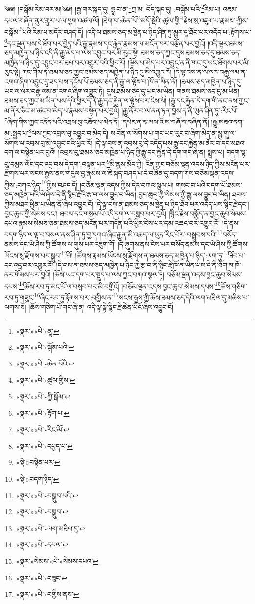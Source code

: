 ༄༅། །བསྒོམ་རིམ་བར་མ།༄༅། །རྒྱ་གར་སྐད་དུ། བྷཱ་བ་ན་\footnote{«སྣར་»«པེ་»ནཱ་}ཀྲ་མ། བོད་སྐད་དུ། :བསྒོམ་པའི་\footnote{«སྣར་»«པེ་»སྒོམ་པའི་}རིམ་པ། འཇམ་དཔལ་གཞོན་ནུར་གྱུར་པ་ལ་ཕྱག་འཚལ་ལོ། །ཐེག་པ་:ཆེན་པོ་\footnote{«སྣར་»«པེ་»ཆེན་པོའི་}མདོ་སྡེའི་:ཚུལ་གྱི་\footnote{«སྣར་»«པེ་»ཚུལ་གྱིས་}རྗེས་སུ་འཇུག་པ་རྣམས་:ཀྱིས་བསྒོམ་\footnote{«སྣར་»«པེ་»ཀྱི་སྒོམ་}པའི་རིམ་པ་མདོར་བཤད་དོ། །འདི་ལ་ཐམས་ཅད་མཁྱེན་པ་ཉིད་ཤིན་ཏུ་མྱུར་དུ་ཐོབ་པར་འདོད་པ་:རྟོགས་པ་\footnote{«སྣར་»«པེ་»རྟོག་པ་}དང་ལྡན་པས་དེ་ཐོབ་པར་བྱེད་པའི་རྒྱུ་རྣམས་དང་རྐྱེན་རྣམས་ལ་མངོན་པར་བརྩོན་པར་བྱའོ། །འདི་ལྟར་ཐམས་ཅད་མཁྱེན་པ་ཉིད་འདི་ནི་རྒྱུ་མེད་པ་ལས་འབྱུང་བར་མི་རུང་སྟེ། ཐམས་ཅད་ཀྱང་དུས་ཐམས་ཅད་དུ་ཐམས་ཅད་མཁྱེན་པ་ཉིད་དུ་འབྱུང་བར་ཐལ་བར་འགྱུར་བའི་ཕྱིར་རོ། །ལྟོས་པ་མེད་པར་འབྱུང་ན་ནི་གང་དུ་ཡང་ཐོགས་པར་མི་རུང་སྟེ། གང་གིས་ན་ཐམས་ཅད་ཀྱང་ཐམས་ཅད་མཁྱེན་པ་ཉིད་དུ་མི་འགྱུར་རོ། །དེ་ལྟ་བས་ན་ལ་ལར་བརྒྱ་ལམ་ན་འགའ་ཞིག་འབྱུང་དུ་ཟད་པས་དངོས་པོ་ཐམས་ཅད་ནི་རྒྱུ་ལ་ལྟོས་པ་ཁོ་ན་ཡིན་ནོ། །ཐམས་ཅད་མཁྱེན་པ་ཉིད་དུ་ཡང་ལ་ལར་བརྒྱ་ལམ་ན་འགའ་ཞིག་འགྱུར་ཏེ། དུས་ཐམས་ཅད་དུ་ཡང་མ་ཡིན། གནས་ཐམས་ཅད་དུ་མ་ཡིན། ཐམས་ཅད་ཀྱང་མ་ཡིན་པས་དེའི་ཕྱིར་དེ་ནི་རྒྱུ་དང་རྐྱེན་ལ་ལྟོས་པར་ངེས་སོ། །རྒྱུ་དང་རྐྱེན་དེ་དག་གི་ནང་ནས་ཀྱང་མ་ནོར་ཅིང་མ་ཚང་བ་མེད་པ་རྣམས་བསྟེན་པར་བྱའོ། །རྒྱུ་ནོར་བ་ལ་ནན་ཏན་བྱས་ན་ནི་ཡུན་ཤིན་ཏུ་:རིང་པོ་\footnote{«སྣར་»«པེ་»རིང་མོ་}ཞིག་གིས་ཀྱང་འདོད་པའི་འབྲས་བུ་འཐོབ་པ་མེད་དོ། །དཔེར་ན་རྭ་ལས་འོ་མ་བཞོ་བ་བཞིན་ནོ། །རྒྱུ་མཐའ་དག་མ་:སྤྱད་པ་\footnote{«སྣར་»«པེ་»དཔྱད་པ་}ལས་ཀྱང་འབྲས་བུ་འབྱུང་བ་མེད་དེ། ས་བོན་ལ་སོགས་པ་གང་ཡང་རུང་བ་ཞིག་མེད་ན་མྱུ་གུ་ལ་སོགས་པ་འབྲས་བུ་མི་འབྱུང་བའི་ཕྱིར་རོ། །དེ་ལྟ་བས་ན་འབྲས་བུ་དེ་འདོད་པས་རྒྱུ་དང་རྐྱེན་མ་ནོར་བ་དང་མཐའ་དག་ལ་བསྟེན་པར་བྱའོ། །འབྲས་བུ་ཐམས་ཅད་མཁྱེན་པ་ཉིད་ཀྱི་རྒྱུ་དང་རྐྱེན་དེ་དག་གང་ཞེ་ན། སྨྲས་པ། བདག་ལྟ་བུ་དམུས་ལོང་དང་འདྲ་བས་དེ་དག་:བསྟན་པར་\footnote{«སྡེ་»བསྟེན་པར་}མི་ནུས་མོད་ཀྱི། འོན་ཀྱང་བཅོམ་ལྡན་འདས་ཉིད་ཀྱིས་མངོན་པར་རྫོགས་པར་སངས་རྒྱས་ནས་གདུལ་བྱ་རྣམས་ལ་ཇི་སྐད་བཤད་པ་དེ་བཞིན་དུ་བདག་གིས་བཅོམ་ལྡན་འདས་ཀྱིས་:བཀའ་ཉིད་\footnote{«སྡེ་»བདག་ཉིད་}ཀྱིས་བཤད་དོ། །བཅོམ་ལྡན་འདས་ཀྱིས་དེར་བཀའ་སྩལ་པ། གསང་བ་པའི་བདག་པོ་ཐམས་ཅད་མཁྱེན་པའི་ཡེ་ཤེས་དེ་ནི་སྙིང་རྗེའི་རྩ་བ་ལས་བྱུང་བ་ཡིན། བྱང་ཆུབ་ཀྱི་སེམས་ཀྱི་རྒྱུ་ལས་བྱུང་བ་ཡིན། ཐབས་ཀྱིས་མཐར་ཕྱིན་པ་ཡིན་ནོ་ཞེས་འབྱུང་ངོ། །དེ་ལྟ་བས་ན་ཐམས་ཅད་མཁྱེན་པ་ཉིད་ཐོབ་པར་འདོད་པས་སྙིང་རྗེ་དང་། བྱང་ཆུབ་ཀྱི་སེམས་དང་། ཐབས་དང་གསུམ་པོ་འདི་དག་ལ་བསླབ་པར་བྱའོ། །སྙིང་རྗེས་བསྐྱོད་ན་བྱང་ཆུབ་སེམས་དཔའ་རྣམས་སེམས་ཅན་ཐམས་ཅད་མངོན་པར་གདོན་པའི་ཕྱིར་ངེས་པར་དམ་འཆའ་བར་འགྱུར་རོ། །དེ་ནས་བདག་ཉིད་ལ་ལྟ་བ་བསལ་ནས་ཤིན་ཏུ་བྱ་དཀའ་ཞིང་རྒྱུན་མི་འཆད་ལ་ཡུན་རིང་པོར་:བསྒྲུབས་པའི་\footnote{«སྣར་»«པེ་»བསྒྲུབ་པའི་}བསོད་ནམས་དང་ཡེ་ཤེས་ཀྱི་ཚོགས་ལ་གུས་པར་འཇུག་གོ། །དེ་ཞུགས་ནས་ངེས་པར་བསོད་ནམས་དང་ཡེ་ཤེས་ཀྱི་ཚོགས་ཡོངས་སུ་རྫོགས་པར་སྒྲུབ་\footnote{«སྣར་»«པེ་»བསྒྲུབ་}བོ། །ཚོགས་རྣམས་ཡོངས་སུ་རྫོགས་ན་ཐམས་ཅད་མཁྱེན་པ་ཉིད་:ལག་ཏུ་\footnote{«སྣར་»«པེ་»ལག་མཐིལ་དུ་}ཐོབ་པ་དང་འདྲ་བར་འགྱུར་རོ། །དེ་བས་ན་ཐམས་ཅད་མཁྱེན་པ་ཉིད་ཀྱི་རྩ་བ་ནི་སྙིང་རྗེ་ཁོ་ན་ཡིན་པས་དེ་ནི་ཐོག་མ་ཁོ་ནར་གོམས་པར་བྱའོ། །ཆོས་ཡང་དག་པར་སྡུད་པ་ལས་ཀྱང་བཀའ་སྩལ་ཏེ། བཅོམ་ལྡན་འདས་བྱང་ཆུབ་སེམས་དཔས་\footnote{«སྣར་»«པེ་»དཔལ་}ཆོས་རབ་ཏུ་མང་པོ་ལ་བསླབ་པར་མི་བགྱིའོ། །བཅོམ་ལྡན་འདས་བྱང་ཆུབ་:སེམས་དཔས་\footnote{«སྣར་»སེམས་«པེ་»སེམས་དཔའ་}ཆོས་གཅིག་རབ་ཏུ་གཟུང་\footnote{«སྣར་»«པེ་»བཟུང་}ཞིང་རབ་ཏུ་རྟོགས་པར་:བགྱིས་ན་\footnote{«སྣར་»«པེ་»བགྱིས་ནས་}སངས་རྒྱས་ཀྱི་ཆོས་ཐམས་ཅད་དེའི་ལག་མཐིལ་དུ་མཆིས་པ་ལགས་སོ། །ཆོས་གཅིག་པོ་གང་ཞེ་ན། འདི་ལྟ་སྟེ་སྙིང་རྗེ་ཆེན་པོའོ་ཞེས་འབྱུང་ངོ། 